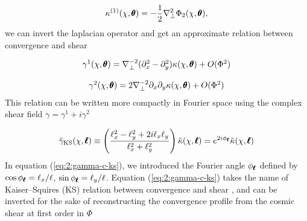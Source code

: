 \begin{equation}
\label{eq:2:kappa-1-lapl}
\kappa^{(1)}(\chi,\pmb{\theta}) = -\frac{1}{2}\nabla_\perp^2 \Phi_2(\chi,\pmb{\theta}),
\end{equation}
%
we can invert the laplacian operator and get an approximate relation between convergence and shear

\begin{equation}
\label{eq:2:gamma-1-lapl}
\begin{matrix}
\gamma^1(\chi,\pmb{\theta}) = \nabla_\perp^{-2} (\partial_x^2-\partial_y^2) \kappa(\chi,\pmb{\theta}) + O(\Phi^2) \\ \\
\gamma^2(\chi,\pmb{\theta}) = 2\nabla_\perp^{-2} \partial_x\partial_y \kappa(\chi,\pmb{\theta}) + O(\Phi^2)
\end{matrix}
\end{equation}
%
This relation can be written more compactly in Fourier space using the complex shear field $\gamma=\gamma^1+i\gamma^2$  

\begin{equation}
\label{eq:2:gamma-c-ks}
\tilde{\gamma}_{\rm KS}(\chi,\pmb{\ell}) \equiv \left(\frac{\ell_x^2-\ell_y^2+2i\ell_x\ell_y}{\ell_x^2+\ell_y^2}\right) \tilde{\kappa}(\chi,\pmb{\ell}) = e^{2i\phi_{\pmb{\ell}}} \tilde{\kappa}(\chi,\pmb{\ell})
\end{equation}
%
In equation (\ref{eq:2:gamma-c-ks}), we introduced the Fourier angle $\phi_{\pmb{\ell}}$ defined by $\cos \phi_{\pmb{\ell}} = \ell_x/\ell$, $\sin\phi_{\pmb{\ell}}=\ell_y/\ell$. Equation (\ref{eq:2:gamma-c-ks}) takes the name of Kaiser--Squires (KS) relation between convergence and shear \citep{KaiserSquires}, and can be inverted for the sake of reconstructing the convergence profile from the cosmic shear at first order in $\Phi$

